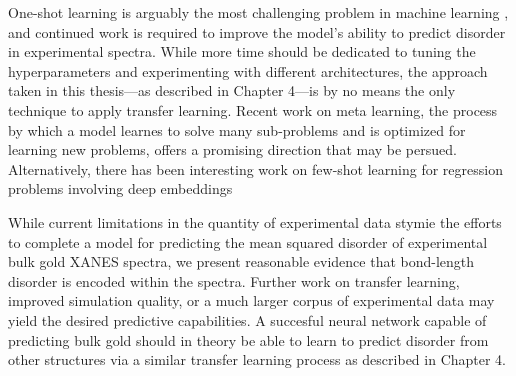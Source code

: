 One-shot learning is arguably the most challenging problem in machine learning \cite{transferlearning3}, and continued work is required to improve the model's ability to predict disorder in experimental spectra. While more time should be dedicated to tuning the hyperparameters and experimenting with different architectures, the approach taken in this thesis---as described in Chapter 4---is by no means the only technique to apply transfer learning. Recent work \cite{meta-learning-orig} \cite{huawei-meta-sgd} \cite{meta-learning2018} on meta learning, the process by which a model learnes to solve many sub-problems and is optimized for learning new problems, offers a promising direction that may be persued. Alternatively, there has been interesting work on few-shot learning for regression problems involving deep embeddings \cite{deepembeddings-few-shot} 

While current limitations in the quantity of experimental data stymie the efforts to complete a model for predicting the mean squared disorder of experimental bulk gold XANES spectra, we present reasonable evidence that bond-length disorder is encoded within the spectra. Further work on transfer learning, improved simulation quality, or a much larger corpus of experimental data may yield the desired predictive capabilities. A succesful neural network capable of predicting bulk gold should in theory be able to learn to predict disorder from other structures via a similar transfer learning process as described in Chapter 4.